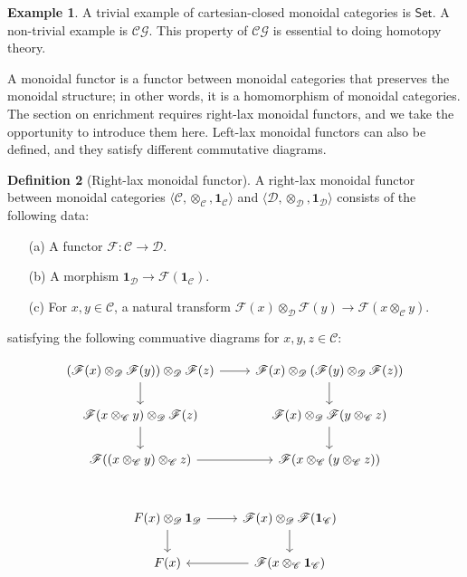 \documentclass[10pt]{amsart}
\newcommand{\8}{\ensuremath{\infty}}
\newcommand{\0}{\ensuremath{\overset{\rightarrow}{0}}}
\newcommand{\1}{\ensuremath{\mathbf{1}}}
\newcommand{\C}{\ensuremath{\mathscr{C}}}
\newcommand{\D}{\ensuremath{\mathscr{D}}}
\newcommand{\F}{\ensuremath{\mathscr{F}}}
\newcommand{\Set}{\ensuremath{\mathsf{Set}}}
\newcommand{\CG}{\ensuremath{\mathscr{CG}}}
\newcommand{\langrang}[1]{\ensuremath{\langle {#1} \rangle}}
\theoremstyle{definition}
\newtheorem{definition}{Definition}[section]
\newtheorem{example}[definition]{Example}
\numberwithin{definition}{subsection}
\numberwithin{definition}{section}
\begin{document}
\begin{example}
  A trivial example of cartesian-closed monoidal categories is \Set. A non-trivial example is \CG. This property of $\CG$ is essential to doing homotopy theory.
\end{example}

A monoidal functor is a functor between monoidal categories that preserves the monoidal structure; in other words, it is a homomorphism of monoidal categories. The section on enrichment requires right-lax monoidal functors, and we take the opportunity to introduce them here. Left-lax monoidal functors can also be defined, and they satisfy different commutative diagrams.

\begin{definition}[Right-lax monoidal functor]
  A right-lax monoidal functor between monoidal categories $\langrang{\C, \otimes_\C, \1_\C}$ and $\langrang{\D, \otimes_\D, \1_\D}$ consists of the following data:

  \begin{enumerate}
    \item[(a)] A functor $\F : \C \rightarrow \D$.
    \item[(b)] A morphism $\1_\D \rightarrow \F(\1_\C)$.
    \item[(c)] For $x, y \in \C$, a natural transform $\F(x) \otimes_\D \F(y) \rightarrow \F(x \otimes_\C y)$.
  \end{enumerate}

  satisfying the following commuative diagrams for $x, y, z \in \C$:

  \begin{equation*}
    \begin{tikzcd}
      (\F(x) \otimes_\D \F(y)) \otimes_\D \F(z) \arrow[r] \arrow[d] & \F(x) \otimes_\D (\F(y) \otimes_\D \F(z)) \arrow[d] \\
      \F(x \otimes_\C y) \otimes_\D \F(z) \arrow[d] & \F(x) \otimes_\D \F(y \otimes_\C z) \arrow[d] \\
      \F((x \otimes_\C y) \otimes_\C z) \arrow[r] & \F(x \otimes_\C (y \otimes_\C z)) \\
    \end{tikzcd}
  \end{equation*}

  \begin{equation*}
    \begin{tikzcd}
      F(x) \otimes_\D \1_\D \arrow[r] \arrow[d] & \F(x) \otimes_\D \F(\1_\C) \arrow[d] \\
      F(x) & \F(x \otimes_\C \1_\C) \arrow[l]
    \end{tikzcd}
  \end{equation*}
\end{definition}
\end{document}

